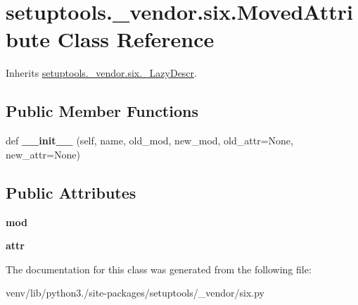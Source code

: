 \hypertarget{classsetuptools_1_1__vendor_1_1six_1_1_moved_attribute}{}\section{setuptools.\+\_\+vendor.\+six.\+Moved\+Attribute Class Reference}
\label{classsetuptools_1_1__vendor_1_1six_1_1_moved_attribute}


Inherits \hyperlink{classsetuptools_1_1__vendor_1_1six_1_1___lazy_descr}{setuptools.\+\_\+vendor.\+six.\+\_\+\+Lazy\+Descr}.

\subsection*{Public Member Functions}
\begin{DoxyCompactItemize}
\item 
\mbox{\label{classsetuptools_1_1__vendor_1_1six_1_1_moved_attribute_aaa214f41610d79b56f1924fadf614d93}} 
def {\bfseries \+\_\+\+\_\+init\+\_\+\+\_\+} (self, name, old\+\_\+mod, new\+\_\+mod, old\+\_\+attr=None, new\+\_\+attr=None)
\end{DoxyCompactItemize}
\subsection*{Public Attributes}
\begin{DoxyCompactItemize}
\item 
\mbox{\label{classsetuptools_1_1__vendor_1_1six_1_1_moved_attribute_ac228288a34a79b7bc6d52d700abb777d}} 
{\bfseries mod}
\item 
\mbox{\label{classsetuptools_1_1__vendor_1_1six_1_1_moved_attribute_acc6b8582c60f84f907bc017c125d41e8}} 
{\bfseries attr}
\end{DoxyCompactItemize}


The documentation for this class was generated from the following file\+:\begin{DoxyCompactItemize}
\item 
venv/lib/python3./site-\/packages/setuptools/\+\_\+vendor/six.\+py\end{DoxyCompactItemize}

